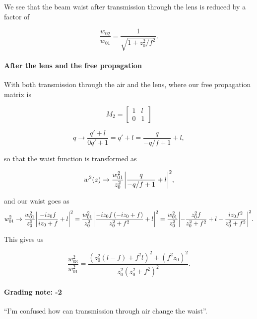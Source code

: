 {We see that the beam waist after transmission through the lens is reduced by a factor of

\begin{dmath}\label{eqn:problemSet4Problem1:140}
\frac
{w_{02}}
{w_{01}}
=
\frac{1}{ \sqrt{1 + z_0^2/f^2} }.
\end{dmath}

\paragraph{After the lens and the free propagation}

With both transmission through the air and the lens, where our free propagation matrix is

\begin{dmath}\label{eqn:problemSet4Problem1:160}
M_2 =
\begin{bmatrix}
1 & l \\
0 & 1
\end{bmatrix}
\end{dmath}

\begin{dmath}\label{eqn:problemSet4Problem1:180}
q
\rightarrow \frac{q' + l}{0 q' + 1}
= q' + l
= \frac{q}{-q/f + 1} + l,
\end{dmath}

so that the waist function is transformed as

\begin{dmath}\label{eqn:problemSet4Problem1:200}
w^2(z) \rightarrow \frac{w_{01}^2}{z_0^2} \Abs{
\frac{q}{-q/f + 1} + l
}^2,
\end{dmath}

and our waist goes as
\begin{dmath}\label{eqn:problemSet4Problem1:220}
w_{01}^2
\rightarrow \frac{w_{01}^2}{z_0^2} \Abs{
\frac{-i z_0 f }{i z_0 + f} + l
}^2
= \frac{w_{01}^2}{z_0^2} \Abs{
\frac{-i z_0 f \left(-i z_0 + f\right)}{z_0^2 + f^2} + l
}^2
= \frac{w_{01}^2}{z_0^2} \Abs{
-\frac{z_0^2 f}{z_0^2 + f^2} + l
-\frac{i z_0 f^2 }{z_0^2 + f^2}
}^2.
\end{dmath}

This gives us

\begin{dmath}\label{eqn:problemSet4Problem1:240}
\boxed{
\frac{w_{03}^2}{w_{01}^2}
= \frac{
\left(z_0^2 \left(l - f\right) + f^2 l\right)^2
+ \left( f^2 z_0  \right)^2
}{z_0^2 \left(z_0^2 + f^2\right)^2 }.
}
\end{dmath}

\paragraph{Grading note: -2} ``I'm confused how can transmission through air change the waist''.

}
